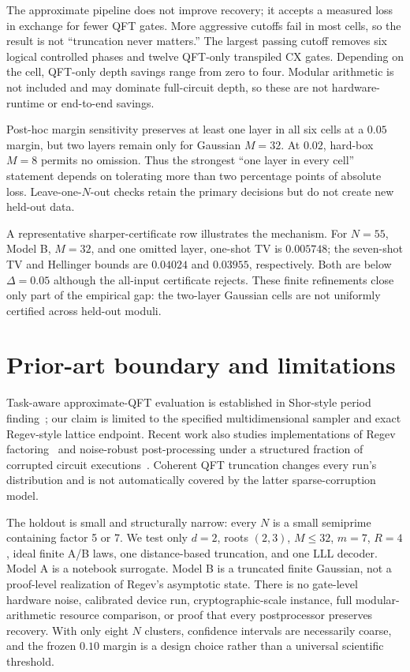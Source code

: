 \documentclass[10pt,twocolumn]{article}
\begin{document}
The approximate pipeline does not improve recovery; it accepts a measured
loss in exchange for fewer QFT gates.  More aggressive cutoffs fail in most
cells, so the result is not ``truncation never matters.''  The largest passing
cutoff removes six logical controlled phases and twelve QFT-only transpiled
CX gates.  Depending on the cell, QFT-only depth savings range from zero to
four.  Modular arithmetic is not included and may dominate full-circuit
depth, so these are not hardware-runtime or end-to-end savings.

Post-hoc margin sensitivity preserves at least one layer in all six cells at
a $0.05$ margin, but two layers remain only for Gaussian $M=32$.  At $0.02$,
hard-box $M=8$ permits no omission.  Thus the strongest ``one layer in every
cell'' statement depends on tolerating more than two percentage points of
absolute loss.  Leave-one-$N$-out checks retain the primary decisions but do
not create new held-out data.

A representative sharper-certificate row illustrates the mechanism.  For
$N=55$, Model B, $M=32$, and one omitted layer, one-shot TV is $0.005748$;
the seven-shot TV and Hellinger bounds are $0.04024$ and $0.03955$,
respectively.  Both are below $\Delta=0.05$ although the all-input certificate
rejects.  These finite refinements close only part of the empirical gap: the
two-layer Gaussian cells are not uniformly certified across held-out moduli.

\section{Prior-art boundary and limitations}

Task-aware approximate-QFT evaluation is established in Shor-style period
finding~\cite{Coppersmith1994,BarencoEtAl1996,FowlerHollenberg2004,
NamBlumel2012,NamBlumel2013}; our claim is limited to the specified
multidimensional sampler and exact Regev-style lattice endpoint.  Recent work
also studies implementations of Regev factoring~\cite{PawlitkoEtAl2026} and
noise-robust post-processing under a structured fraction of corrupted circuit
executions~\cite{RagavanVaikuntanathan2026}.  Coherent QFT truncation changes
every run's distribution and is not automatically covered by the latter
sparse-corruption model.

The holdout is small and structurally narrow: every $N$ is a small semiprime
containing factor 5 or 7.  We test only $d=2$, roots $(2,3)$, $M\leq32$,
$m=7$, $R=4$, ideal finite A/B laws, one distance-based truncation, and one
LLL decoder.  Model A is a notebook surrogate.  Model B is a truncated finite
Gaussian, not a proof-level realization of Regev's asymptotic state.  There
is no gate-level hardware noise, calibrated device run, cryptographic-scale
instance, full modular-arithmetic resource comparison, or proof that every
postprocessor preserves recovery.  With only eight $N$ clusters, confidence
intervals are necessarily coarse, and the frozen $0.10$ margin is a design
choice rather than a universal scientific threshold.
\end{document}
